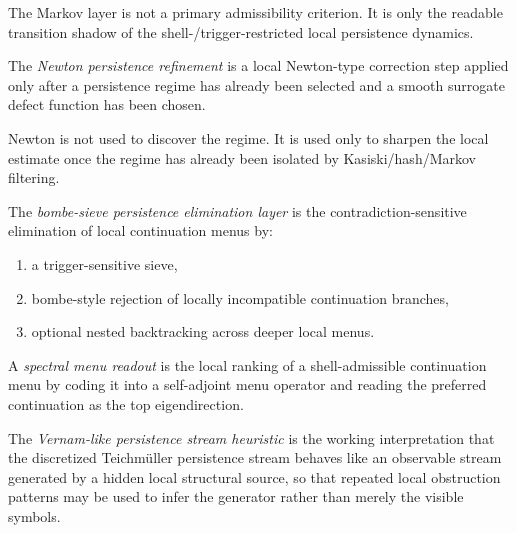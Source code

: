 \begin{remark}
\label{rem:role-of-markov-control}
The Markov layer is not a primary admissibility criterion.
It is only the readable transition shadow of the shell-/trigger-restricted local persistence dynamics.
\end{remark}

\begin{definition}
\label{def:newton-persistence-refinement}
The \emph{Newton persistence refinement} is a local Newton-type correction step applied only after a persistence regime has already been selected and a smooth surrogate defect function has been chosen.
\end{definition}

\begin{remark}
\label{rem:why-newton-comes-last}
Newton is not used to discover the regime.
It is used only to sharpen the local estimate once the regime has already been isolated by Kasiski/hash/Markov filtering.
\end{remark}

\begin{definition}
\label{def:bombe-sieve-persistence-elimination}
The \emph{bombe-sieve persistence elimination layer} is the contradiction-sensitive elimination of local continuation menus by:
\begin{enumerate}
 \item a trigger-sensitive sieve,
 \item bombe-style rejection of locally incompatible continuation branches,
 \item optional nested backtracking across deeper local menus.
\end{enumerate}
\end{definition}

\begin{definition}
\label{def:spectral-menu-readout}
A \emph{spectral menu readout} is the local ranking of a shell-admissible continuation menu by coding it into a self-adjoint menu operator and reading the preferred continuation as the top eigendirection.
\end{definition}

\begin{definition}
\label{def:vernam-like-persistence-stream-heuristic}
The \emph{Vernam-like persistence stream heuristic} is the working interpretation that the discretized Teichm\"uller persistence stream behaves like an observable stream generated by a hidden local structural source, so that repeated local obstruction patterns may be used to infer the generator rather than merely the visible symbols.
\end{definition}

